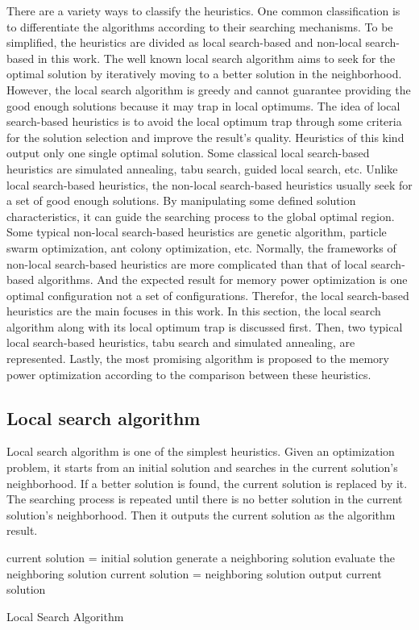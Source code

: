 	There are a variety ways to classify the heuristics.
	One common classification is to differentiate the algorithms
	according to their searching mechanisms. To be simplified, the
	heuristics are divided as local search-based and
	non-local search-based in this work.
	The well known local search algorithm aims to seek for the
	optimal solution by iteratively moving to a better solution
	in the neighborhood. However, the local search algorithm is 
	greedy and cannot guarantee providing the good enough solutions
	because it may trap in local optimums. The idea of local search-based
	heuristics is to avoid the local optimum trap through some criteria
	for the solution selection and improve the result's quality.
	Heuristics of this kind output only one single optimal solution.
	Some classical local search-based heuristics are simulated annealing,
	tabu search, guided local search, etc. Unlike local search-based
	heuristics, the non-local search-based heuristics usually seek for a
	set of good enough solutions. By manipulating some defined solution
	characteristics, it can guide the searching process to the global optimal
	region. Some typical non-local search-based heuristics are genetic
	algorithm, particle swarm optimization, ant colony optimization, etc.
	Normally, the frameworks of non-local search-based heuristics are more
	complicated than that of local search-based algorithms. And the expected
	result for memory power optimization is one optimal configuration not a
	set of configurations. Therefor, the local search-based heuristics are
	the main focuses in this work.
	In this section, the local search algorithm along with its local optimum
	trap is discussed first. Then, two typical local search-based heuristics,
	tabu search and simulated annealing, are represented. Lastly, the most
	promising algorithm  is proposed to the memory power optimization according
	to the comparison between these heuristics.
	\newpage
		\subsection{Local search algorithm}
		\label{subsec:local_search}
		Local search algorithm is one of the simplest heuristics. Given an
		optimization problem, it starts from an initial solution and searches
		in the current solution's neighborhood. If a better solution is found,
		the current solution is replaced by it. The searching process is repeated
		until there is no better solution in the current solution's neighborhood.
		Then it outputs the current solution as the algorithm result.
\setlength{\textfloatsep}{0.2cm}
\begin{algorithm2e}[htb]
	current solution = initial solution\;
	{
		generate a neighboring solution\;
		evaluate the neighboring solution\;
		{
			current solution = neighboring solution\;
		}
	}
	output current solution\;
	\caption{Local Search Algorithm}
	\label{algo:local_search}
\end{algorithm2e}
\setlength{\textfloatsep}{0.2cm}
		
